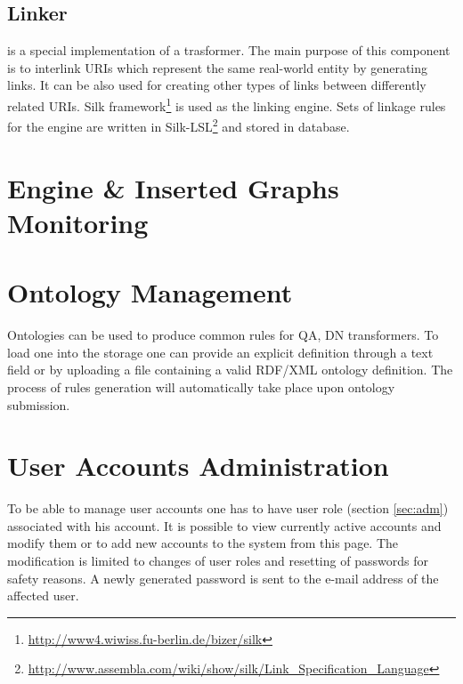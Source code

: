 
\subsection{Linker}
\label{sub:objectIdentification}

 is a special implementation of a {trasformer}. The main purpose of this component is to interlink URIs which represent the same real-world entity by generating  links. It can be also used for creating other types of links between differently related URIs. {Silk framework}\footnote{\url{http://www4.wiwiss.fu-berlin.de/bizer/silk}} is used as the linking engine. Sets of linkage rules for the engine are written in {Silk-LSL}\footnote{\url{http://www.assembla.com/wiki/show/silk/Link\_Specification\_Language}} and stored in database.

\section{Engine \& Inserted Graphs Monitoring}
\label{sec:engineState}

\section{Ontology Management}
\label{sec:ontologyManagement}

Ontologies can be used to produce common rules for QA, DN {transformers}. To load one into the storage one can provide an explicit definition through a text field or by uploading a file containing a valid {RDF/XML} ontology definition. The process of rules generation will automatically take place upon ontology submission.

\section{User Accounts Administration}

To be able to manage user accounts one has to have  user role (section \ref{sec:adm}) associated with his account. It is possible to view currently active accounts and modify them or to add new accounts to the system from this page. The modification is limited to changes of user roles and resetting of passwords for safety reasons. A newly generated password is sent to the e-mail address of the affected user.

